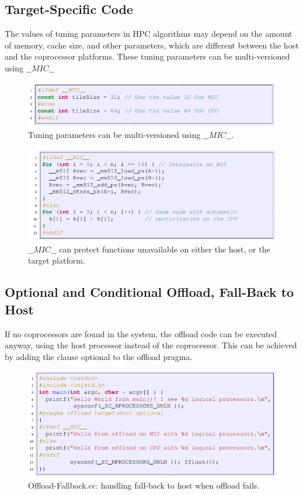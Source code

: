 \documentclass[12pt]{article}
\begin{document}
\subsection{Target-Specific Code}
The values of tuning parameters in HPC algorithms may depend on
the amount of memory, cache size, and other parameters, which are different
between the host and the coprocessor platforms. These tuning parameters
can be multi-versioned using $ \_\_MIC\_\_$
\begin{figure}[H]
\centering
\includegraphics[scale = 0.9]{chainer20.png}
\caption{Tuning parameters can be multi-versioned using $\_\_MIC\_\_$.}
\end{figure}

\begin{figure}[H]
\centering
\includegraphics[scale = 0.9]{chainer21.png}
\caption{$\_\_MIC\_\_$ can protect functions unavailable on either the host, or the target platform.}
\end{figure}

\subsection{Optional and Conditional Offload, Fall-Back to Host}
If no coprocessors are found in the system, the offload code can be executed anyway, using the host processor instead of the coprocessor. This can be achieved by adding the clause optional to the offload pragma.
\begin{figure}[H]
\centering
\includegraphics[scale = 0.9]{chainer22.png}
\caption{Offload-Fallback.cc: handling fall-back to host when offload fails.}
\end{figure}
\end{document}
